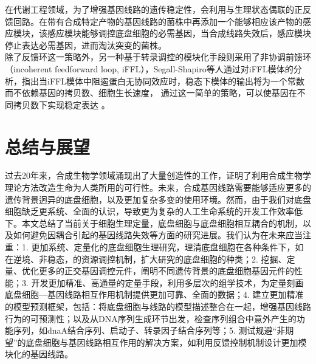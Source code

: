 \documentclass[b5paper,11pt,onecolumn,twoside,UTF8]{article}
\begin{document}
\indent 在代谢工程领域，为了增强基因线路的遗传稳定性，会利用与生理状态偶联的正反馈回路\cite{Rugbjerg2018, Xiao2016}。在带有合成特定产物的基因线路的菌株中再添加一个能够相应该产物的感应模块，该感应模块能够调控底盘细胞的必需基因，当合成线路失效后，感应模块停止表达必需基因，进而淘汰突变的菌株。\\
\indent 除了反馈环这一策略外，另一种基于转录调控的模块化手段则采用了非协调前馈环（incoherent feedforward loop, iFFL），Segall-Shapiro等人通过对iFFL模体的分析，指出当iFFL模体中阻遏蛋白无协同效应时，稳态下模体的输出将为一个常数而不依赖基因的拷贝数、细胞生长速度， 通过这一简单的策略，可以使基因在不同拷贝数下实现稳定表达 \cite{Segall-Shapiro2018} 。
\section{总结与展望}
过去20年来，合成生物学领域涌现出了大量创造性的工作，证明了利用合成生物学理论方法改造生命为人类所用的可行性。未来，合成基因线路需要能够适应更多的遗传背景迥异的底盘细胞，以及更加复杂多变的使用环境。然而，由于我们对底盘细胞缺乏更系统、全面的认识，导致更为复杂的人工生命系统的开发工作效率低下。本文总结了当前关于细胞生理定量，底盘细胞与底盘细胞相互耦合的机制，以及如何避免因耦合引起的基因线路失效等方面的研究进展。我们认为在未来应当注重：1. 更加系统、定量化的底盘细胞生理研究，理清底盘细胞在各种条件下，如在逆境、非稳态，的资源调控机制，扩大研究的底盘细胞的种类；2. 挖掘、定量、优化更多的正交基因调控元件，阐明不同遗传背景的底盘细胞基因元件的性能；3. 开发更加精准、高通量的定量手段，利用多层次的组学技术，为定量刻画底盘细胞---基因线路相互作用机制提供更加可靠、全面的数据；4. 建立更加精准的模型预测框架，包括：将底盘细胞与线路的模型描述整合在一起，增强基因线路行为的可预测性；以及从DNA序列生成环节出发，检查序列组合中意外产生的功能序列，如dnaA结合序列、启动子、转录因子结合序列等；5. 测试规避“非期望”的底盘细胞与基因线路相互作用的解决方案，如利用反馈控制机制设计更加模块化的基因线路。
\vspace{2ex} 
\printbibliography
\end{document}
